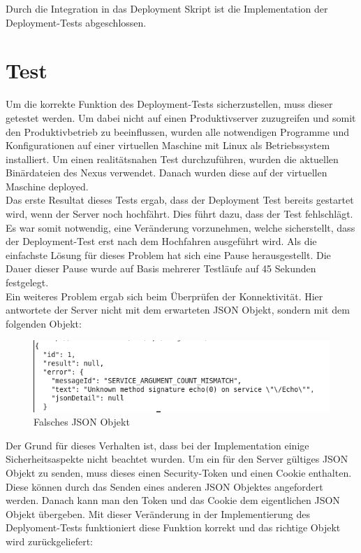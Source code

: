 Durch die Integration in das Deployment Skript ist die Implementation der Deployment-Tests abgeschlossen.

\section{Test}
Um die korrekte Funktion des Deployment-Tests sicherzustellen, muss dieser getestet werden. Um dabei nicht auf einen Produktivserver zuzugreifen und somit den Produktivbetrieb zu beeinflussen, wurden alle notwendigen Programme und Konfigurationen auf einer virtuellen Maschine mit Linux als Betriebssystem installiert. Um einen realitätsnahen Test durchzuführen, wurden die aktuellen Binärdateien des Nexus verwendet. Danach wurden diese auf der virtuellen Maschine deployed.\\
Das erste Resultat dieses Tests ergab, dass der Deployment Test bereits gestartet wird, wenn der Server noch hochfährt. Dies führt dazu, dass der Test fehlschlägt. Es war somit notwendig, eine Veränderung vorzunehmen, welche sicherstellt, dass der Deployment-Test erst nach dem Hochfahren ausgeführt wird. Als die einfachste Lösung für dieses Problem hat sich eine Pause herausgestellt. Die Dauer dieser Pause wurde auf Basis mehrerer Testläufe auf 45 Sekunden festgelegt.\\
Ein weiteres Problem ergab sich beim Überprüfen der Konnektivität.  Hier antwortete der Server nicht mit dem erwarteten \acs{JSON} Objekt, sondern mit dem folgenden Objekt:
\begin{figure}[H]
\vspace{-5pt}
\centering
\includegraphics[width=1\textwidth]{../images/json_error}
\vspace{-25pt}
\caption{Falsches JSON Objekt}
\vspace{-10pt}
\label{fig:json_error}
\end{figure}
Der Grund für dieses Verhalten ist, dass bei der Implementation einige Sicherheitsaspekte nicht beachtet wurden. Um ein für den Server gültiges \acs{JSON} Objekt zu senden, muss dieses einen Security-Token und einen Cookie enthalten. Diese können durch das Senden eines anderen \acs{JSON} Objektes  angefordert werden. Danach kann man den Token und das Cookie dem eigentlichen \acs{JSON} Objekt übergeben. Mit dieser Veränderung in der Implementierung des Deplyoment-Tests funktioniert diese Funktion korrekt und das richtige Objekt wird zurückgeliefert:
